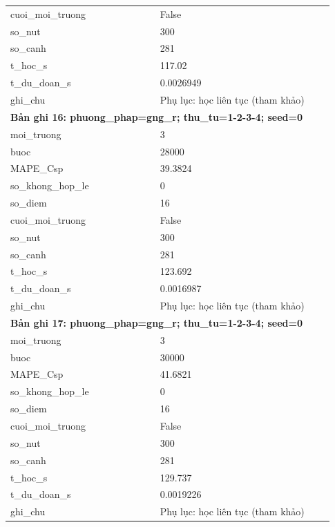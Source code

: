 \begin{longtable}{p{0.43\linewidth}p{0.50\linewidth}}
cuoi\_\allowbreak moi\_\allowbreak truong & False \\
so\_\allowbreak nut & 300 \\
so\_\allowbreak canh & 281 \\
t\_\allowbreak hoc\_\allowbreak s & 117.02 \\
t\_\allowbreak du\_\allowbreak doan\_\allowbreak s & 0.0026949 \\
ghi\_\allowbreak chu & Phụ lục: học liên tục (tham khảo) \\
\midrule
\multicolumn{2}{p{0.95\linewidth}}{\textbf{Bản ghi 16: phuong\_phap=gng\_r; thu\_tu=1-2-3-4; seed=0}} \\
moi\_\allowbreak truong & 3 \\
buoc & 28000 \\
MAPE\_\allowbreak Csp & 39.3824 \\
so\_\allowbreak khong\_\allowbreak hop\_\allowbreak le & 0 \\
so\_\allowbreak diem & 16 \\
cuoi\_\allowbreak moi\_\allowbreak truong & False \\
so\_\allowbreak nut & 300 \\
so\_\allowbreak canh & 281 \\
t\_\allowbreak hoc\_\allowbreak s & 123.692 \\
t\_\allowbreak du\_\allowbreak doan\_\allowbreak s & 0.0016987 \\
ghi\_\allowbreak chu & Phụ lục: học liên tục (tham khảo) \\
\midrule
\multicolumn{2}{p{0.95\linewidth}}{\textbf{Bản ghi 17: phuong\_phap=gng\_r; thu\_tu=1-2-3-4; seed=0}} \\
moi\_\allowbreak truong & 3 \\
buoc & 30000 \\
MAPE\_\allowbreak Csp & 41.6821 \\
so\_\allowbreak khong\_\allowbreak hop\_\allowbreak le & 0 \\
so\_\allowbreak diem & 16 \\
cuoi\_\allowbreak moi\_\allowbreak truong & False \\
so\_\allowbreak nut & 300 \\
so\_\allowbreak canh & 281 \\
t\_\allowbreak hoc\_\allowbreak s & 129.737 \\
t\_\allowbreak du\_\allowbreak doan\_\allowbreak s & 0.0019226 \\
ghi\_\allowbreak chu & Phụ lục: học liên tục (tham khảo) \\

\end{longtable}
